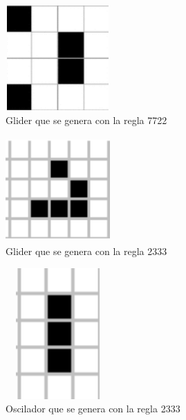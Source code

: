 \begin{figure}[H]
\begin{center}
 \includegraphics[width=4cm, height=4cm]{./img/glider2.png}
 \caption{Glider que se genera con la regla 7722}
 \label{fig:glider2}
\end{center}
\end{figure}

\begin{figure}[H]
\begin{center}
 \includegraphics[width=4cm, height=4cm]{./img/glider3.png}
 \caption{Glider que se genera con la regla 2333}
 \label{fig:glider3}
\end{center}
\end{figure}

\begin{figure}[H]
\begin{center}
 \includegraphics[width=4cm, height=5cm]{./img/oscilador.png}
 \caption{Oscilador que se genera con la regla 2333}
 \label{fig:oscilador}
\end{center}
\end{figure}


